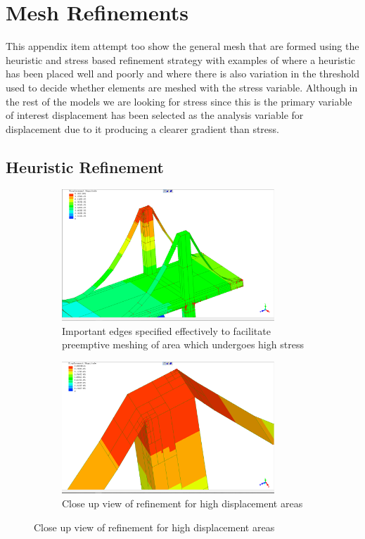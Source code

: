 \newpage
\section{Mesh Refinements}
This appendix item attempt too show the general mesh that are formed using the heuristic and stress based refinement strategy with examples of where a heuristic has been placed well and poorly and where there is also variation in the threshold used to decide whether elements are meshed with the stress variable. Although in the rest of the models we are looking for stress since this is the primary variable of interest displacement has been selected as the analysis variable for displacement due to it producing a clearer gradient than stress.

\subsection{Heuristic Refinement}
\begin{figure}[H]
\centering
\begin{subfigure}{.5\textwidth}
  \centering
	\includegraphics[width=80mm, scale=0.5]{../Graphics/BridgeCrossLoading/bestEdgeSpecResults.png}
  \caption{Important edges specified effectively to facilitate preemptive meshing of area which undergoes high stress}
  \label{fig:sub1}
\end{subfigure}%
\begin{subfigure}{.5\textwidth}
  \centering
  \centerline{\includegraphics[width=80mm, scale=0.5]{../Graphics/BridgeCrossLoading/bestEdgeSpecResultsCloseUp.png}}
  \caption{Close up view of refinement for high displacement areas }
  \label{fig:sub2}
\end{subfigure}
\label{fig:test}
\end{figure}


